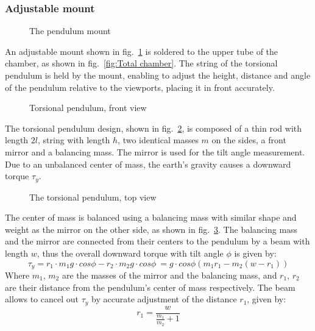 \documentclass[\main/master.tex]{subfiles}
\begin{document}
\subsubsection{Adjustable mount}
\begin{figure}[htbp]
	\centering
	\caption[The pendulum mount]{The pendulum mount}
	\label{fig:mount}
\end{figure}
\FloatBarrier
\par\noindent
An adjustable mount shown in fig.~\ref{fig:mount} is soldered to the upper tube of the chamber, as shown in fig.~\ref{fig:Total chamber}. The string of the torsional pendulum is held by the mount, enabling to adjust the height, distance and angle of the pendulum relative to the viewports, placing it in front accurately. 
\begin{figure}[htbp]
	\centering
	\caption[Torsional pendulum, front view]{Torsional pendulum, front view}
	\label{fig:pendulum front}
\end{figure}
\FloatBarrier
\par\noindent
The torsional pendulum design, shown in fig.~\ref{fig:pendulum front}, is composed of a thin rod with length $2l$, string with length $h$, two identical masses $m$ on the sides, a front mirror and a balancing mass. The mirror is used for the tilt angle measurement. Due to an unbalanced center of mass, the earth's gravity causes a downward torque $\tau_y$. 
\begin{figure}[htbp]
	\centering
	\caption[The torsional pendulum, top view]{The torsional pendulum, top view}
	\label{fig:pendulum top}
\end{figure}
\FloatBarrier 
\par\noindent
The center of mass is balanced using a balancing mass with similar shape and weight as the mirror on the other side, as shown in fig.~\ref{fig:pendulum top}. The balancing mass and the mirror are connected from their centers to the pendulum by a beam with length $w$, thus the overall downward torque with tilt angle $\phi$ is given by:
\begin{equation}
\tau_y = r_1\cdot m_1 g \cdot cos\phi - r_2\cdot m_2 g \cdot cos \phi\ = g\cdot cos\phi( m_1 r_1  - m_2 (w-r_1) )    \label{eqn:downward torque}
\end{equation}
Where $m_1$, $m_2$ are the masses of the mirror and the balancing mass, and $r_1$, $r_2$ are their distance from the pendulum's center of mass respectively. The beam allows to cancel out $\tau_y$ by accurate adjustment of the distance $r_1$, given by: 
\begin{equation}
 r_1 = \frac{w}{\frac{m_1}{m_2}+1}  \label{eqn:downward torque cancelled}
\end{equation}
\end{document}
